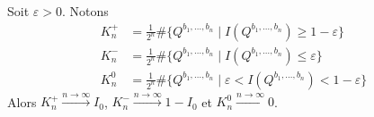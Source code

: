 \begin{thm}
	Soit $\varepsilon > 0$. Notons
	$$\begin{align}
		K_n^+ & = \frac{1}{2^n} \# \{ Q^{b_1,\ldots,b_n} \mid I(Q^{b_1,\ldots,b_n}) \geq 1 - \varepsilon \} \\
		K_n^- & = \frac{1}{2^n} \# \{ Q^{b_1,\ldots,b_n} \mid I(Q^{b_1,\ldots,b_n}) \leq \varepsilon \} \\
		K_n^0 & = \frac{1}{2^n} \# \{ Q^{b_1,\ldots,b_n} \mid \varepsilon < I(Q^{b_1,\ldots,b_n}) < 1 - \varepsilon \}
	\end{align}$$
	Alors $K_n^+ \overset{n \to \infty}{\longrightarrow} I_0$, $K_n^- \overset{n \to \infty}{\longrightarrow} 1 - I_0$ et $K_n^0 \overset{n \to \infty}{\longrightarrow} 0$.
\end{thm}